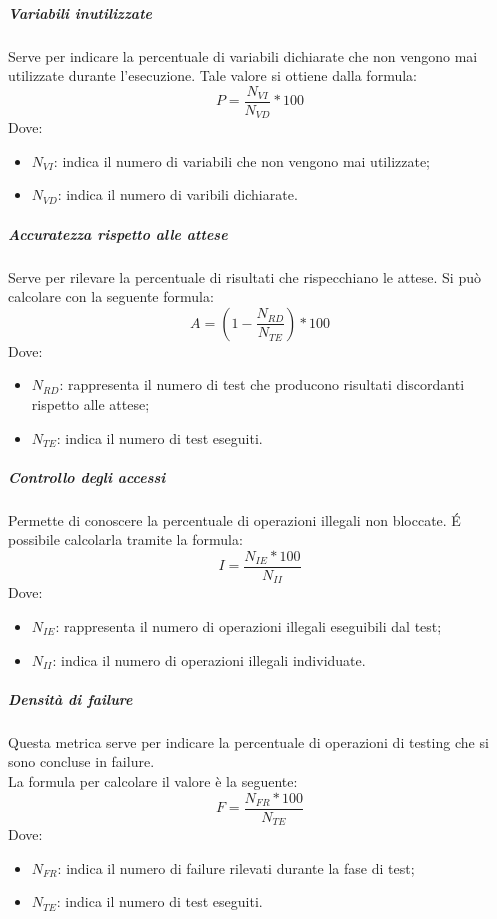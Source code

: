 \documentclass[../NormeDiProgetto_v3.0.0.tex]{subfiles}
\begin{document}
			\subparagraph{Variabili inutilizzate}
				Serve per indicare la percentuale di variabili dichiarate che non vengono mai utilizzate durante l'esecuzione.
				Tale valore si ottiene dalla formula:
				\begin{equation*}
					P = \frac{N_{VI}}{N_{VD}} * 100
				\end{equation*}
				Dove:
				\begin{itemize}
					\item \textbf{$N_{VI}$}: indica il numero di variabili che non vengono mai utilizzate;
					\item \textbf{$N_{VD}$}: indica il numero di varibili dichiarate.
				\end{itemize}
			

			\subparagraph{Accuratezza rispetto alle attese}
				Serve per rilevare la percentuale di risultati che rispecchiano le attese.
				Si può calcolare con la seguente formula:
				\begin{equation*}
					A = (1 - \frac{N_{RD}}{N_{TE}})*100
				\end{equation*}
				Dove:
				\begin{itemize}
					\item \textbf{$N_{RD}$}: rappresenta il numero di test che producono risultati discordanti rispetto alle attese;
					\item \textbf{$N_{TE}$}: indica il numero di test eseguiti.
				\end{itemize}
				

			\subparagraph{Controllo degli accessi}
				Permette di conoscere la percentuale di operazioni illegali non bloccate.
				É possibile calcolarla tramite la formula:
				\begin{equation*}
					I = \frac{N_{IE} * 100}{N_{II}}
				\end{equation*}
				Dove:
				\begin{itemize}
					\item \textbf{$N_{IE}$}: rappresenta il numero di operazioni illegali eseguibili dal test;
					\item \textbf{$N_{II}$}: indica il numero di operazioni illegali individuate.
				\end{itemize}
				
			\subparagraph{Densità di failure}
				Questa metrica serve per indicare la percentuale di operazioni di testing che si sono concluse in failure. \\La formula per calcolare il valore è la seguente:
				\begin{equation*}
					F = \frac{N_{FR} * 100}{N_{TE}}
				\end{equation*}
				Dove:
				\begin{itemize}
					\item \textbf{$N_{FR}$}: indica il numero di failure rilevati durante la fase di test;
					\item \textbf{$N_{TE}$}: indica il numero di test eseguiti.
				\end{itemize}
				
\end{document}
